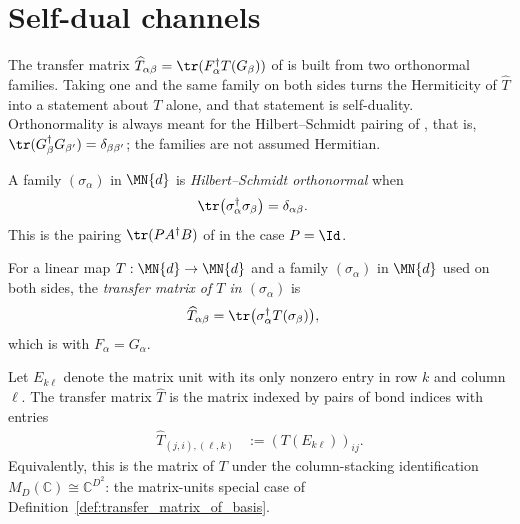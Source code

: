 \section{Self-dual channels}
\label{sec:self_dual_channels}

The transfer matrix $\widehat T_{\alpha\beta}=\tr(F_\alpha^\dagger T(G_\beta))$
of \cite[Section~2.3, Equation~(2.20)]{Wolf2012Quantum} is built from two
orthonormal families. Taking one and the same family on both sides turns the
Hermiticity of $\widehat T$ into a statement about $T$ alone, and that statement
is self-duality. Orthonormality is always meant for the Hilbert--Schmidt
pairing of \cite[Section~2.3, Equation~(2.18)]{Wolf2012Quantum}, that is,
$\tr(G_\beta^\dagger G_{\beta'})=\delta_{\beta\beta'}$; the families are not
assumed Hermitian.

\begin{definition}
    \label{def:hilbert_schmidt_orthonormal}
    \leanok
    A family $(\sigma_\alpha)$ in $\MN{d}$ is \emph{Hilbert--Schmidt orthonormal}
    when
    \begin{align}
        \tr\bigl(\sigma_\alpha^\dagger \sigma_\beta\bigr)
        &= \delta_{\alpha\beta}.
    \end{align}
    This is the pairing $\tr(PA^\dagger B)$ of
    \cite[Equation~(2.18)]{Wolf2012Quantum} in the case $P=\Id$.
\end{definition}

\begin{definition}
    \label{def:transfer_matrix_of_basis}
    \leanok
    For a linear map $T:\MN{d}\to\MN{d}$ and a family $(\sigma_\alpha)$ in
    $\MN{d}$ used on both sides, the \emph{transfer matrix of $T$ in
    $(\sigma_\alpha)$} is
    \begin{align}
        \widehat T_{\alpha\beta}
        &= \tr\bigl(\sigma_\alpha^\dagger T(\sigma_\beta)\bigr),
    \end{align}
    which is \cite[Equation~(2.20)]{Wolf2012Quantum} with $F_\alpha=G_\alpha$.
\end{definition}

\begin{definition}
    \label{def:mpu_transfer_matrix}
    \leanok
    Let $E_{k\ell}$ denote the matrix unit with its only nonzero entry in
    row $k$ and column $\ell$.  The transfer matrix $\widehat T$ is the
    matrix indexed by pairs of bond indices with entries
    \begin{align}
        \widehat T_{(j,i),(\ell,k)}
        &:=(T(E_{k\ell}))_{ij}.
    \end{align}
    Equivalently, this is the matrix of $T$ under the column-stacking
    identification $M_D(\mathbb C)\cong\mathbb C^{D^2}$: the matrix-units
    special case of Definition~\ref{def:transfer_matrix_of_basis}.
\end{definition}

